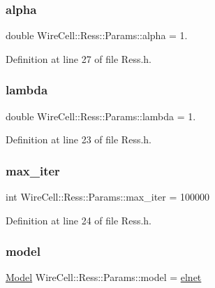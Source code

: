 \subsubsection{\texorpdfstring{alpha}{alpha}}
{\footnotesize\ttfamily double Wire\+Cell\+::\+Ress\+::\+Params\+::alpha = 1.}



Definition at line 27 of file Ress.\+h.

\mbox{\label{struct_wire_cell_1_1_ress_1_1_params_a40cb73924fd9380e75e59da9ba1f8483}} 
\subsubsection{\texorpdfstring{lambda}{lambda}}
{\footnotesize\ttfamily double Wire\+Cell\+::\+Ress\+::\+Params\+::lambda = 1.}



Definition at line 23 of file Ress.\+h.

\mbox{\label{struct_wire_cell_1_1_ress_1_1_params_a5a79eae5c66b7dc8ad2e5a5115990248}} 
\subsubsection{\texorpdfstring{max\+\_\+iter}{max\_iter}}
{\footnotesize\ttfamily int Wire\+Cell\+::\+Ress\+::\+Params\+::max\+\_\+iter = 100000}



Definition at line 24 of file Ress.\+h.

\mbox{\label{struct_wire_cell_1_1_ress_1_1_params_afa3d8d7b22586f2e7deb9bc74e06ecbe}} 
\subsubsection{\texorpdfstring{model}{model}}
{\footnotesize\ttfamily \hyperlink{namespace_wire_cell_1_1_ress_abca29d9a906e0f4e9be142ff3b3b3573}{Model} Wire\+Cell\+::\+Ress\+::\+Params\+::model = \hyperlink{namespace_wire_cell_1_1_ress_abca29d9a906e0f4e9be142ff3b3b3573a2b1f23a7622c659094509e0bb0843d86}{elnet}}



